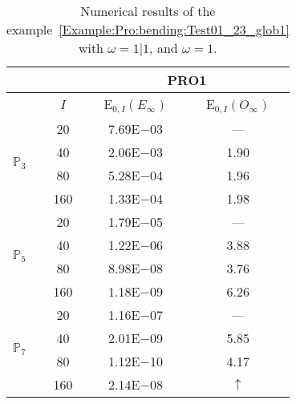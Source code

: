 \begin{table}[H]
\caption{Numerical results of the example~\ref{Example:Pro:bending:Test01_23_glob1} with $\omega=1|1$, and $\omega=1$.}
\setlength{\tabcolsep}{5pt}
\centering
\begin{tabular}{@{}l c c c@{}}
\toprule
 &  & \multicolumn{2}{c}{PRO1}\\
\midrule
 & $I$ & E$_{0,I}(E_{\infty})$ & E$_{0,I}(O_{\infty})$\\
\midrule
\multirow{4}{*}{$\mathbb{P}_{3}$} & 20 & 7.69E$-$03 & ---\\
 & 40 & 2.06E$-$03 & 1.90\\
 & 80 & 5.28E$-$04 & 1.96\\
 & 160 & 1.33E$-$04 & 1.98\\
\midrule
\multirow{4}{*}{$\mathbb{P}_{5}$} & 20 & 1.79E$-$05 & ---\\
 & 40 & 1.22E$-$06 & 3.88\\
 & 80 & 8.98E$-$08 & 3.76\\
 & 160 & 1.18E$-$09 & 6.26\\
\midrule
\multirow{4}{*}{$\mathbb{P}_{7}$} & 20 & 1.16E$-$07 & ---\\
 & 40 & 2.01E$-$09 & 5.85\\
 & 80 & 1.12E$-$10 & 4.17\\
 & 160 & 2.14E$-$08 & $\uparrow$\\
\bottomrule
\end{tabular}
\label{Table:PRO:test_01_23_test13}
\end{table}
